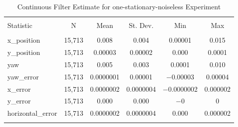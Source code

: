 
\begin{table}[h] \centering 
  \caption{Continuous Filter Estimate for one-stationary-noiseless Experiment} 
  \label{tab:one_stationary_noiseless_continuous_summary} 
\begin{tabular}{@{\extracolsep{5pt}}lccccc} 
\\[-1.8ex]\hline 
\hline \\[-1.8ex] 
Statistic & \multicolumn{1}{c}{N} & \multicolumn{1}{c}{Mean} & \multicolumn{1}{c}{St. Dev.} & \multicolumn{1}{c}{Min} & \multicolumn{1}{c}{Max} \\ 
\hline \\[-1.8ex] 
x\_position & 15,713 & 0.008 & 0.004 & 0.00001 & 0.015 \\ 
y\_position & 15,713 & 0.00003 & 0.00002 & 0.000 & 0.0001 \\ 
yaw & 15,713 & 0.005 & 0.003 & 0.0001 & 0.010 \\ 
yaw\_error & 15,713 & 0.0000001 & 0.00001 & $-$0.00003 & 0.00004 \\ 
x\_error & 15,713 & 0.0000002 & 0.0000004 & $-$0.0000002 & 0.000002 \\ 
y\_error & 15,713 & 0.000 & 0.000 & $-$0 & 0 \\ 
horizontal\_error & 15,713 & 0.0000002 & 0.0000004 & 0.000 & 0.000002 \\ 
\hline \\[-1.8ex] 
\end{tabular} 
\end{table} 
